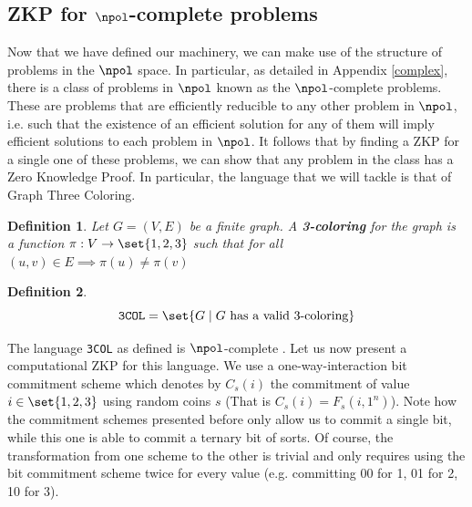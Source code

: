 \documentclass{article}
\newtheorem{definition}{Definition}
\begin{document}
\subsection{ZKP for \texorpdfstring{$\npol$}{NP}-complete problems}
\label{np}
Now that we have defined our machinery, we can make use of the structure of problems in the $\npol$ space.
In particular, as detailed in Appendix \ref{complex}, there is a class of problems in $\npol$ known as the $\npol$-complete problems.
These are problems that are efficiently reducible to any other problem in $\npol$, i.e. such that the existence of an efficient solution for any of them will imply efficient solutions to each problem in $\npol$.
It follows that by finding a ZKP for a single one of these problems, we can show that any problem in the class has a Zero Knowledge Proof.
In particular, the language that we will tackle is that of Graph Three Coloring.
\begin{definition}
    Let $G = (V, E)$ be a finite graph. A \textbf{3-coloring} for the graph is a function $\pi: V \to \set{1, 2, 3}$
    such that for all $(u, v) \in E \implies \pi(u) \neq \pi(v)$
\end{definition}
\begin{definition}
    \[ \texttt{3COL} = \set{ G \; | \; G \text{ has a valid 3-coloring} } \]
\end{definition}
The language \texttt{3COL} as defined is $\npol$-complete \cite{karpReducibilityCombinatorialProblems1972}.
Let us now present a computational ZKP \cite{goldreichProofsThatYield1991} \cite{goldreichMethodologyCryptographicProtocol} for this language. We use a one-way-interaction bit commitment scheme which denotes by
$C_s(i)$ the commitment of value $i \in \set{1, 2, 3}$ using random coins $s$ (That is $C_s(i) = F_s(i, 1^n)$). Note how the commitment schemes
presented before only allow us to commit a single bit, while this one is able to commit a ternary bit of sorts. Of course, the transformation
from one scheme to the other is trivial and only requires using the bit commitment scheme twice for every value (e.g. committing 00 for 1, 01 for 2, 10 for 3).
\end{document}
